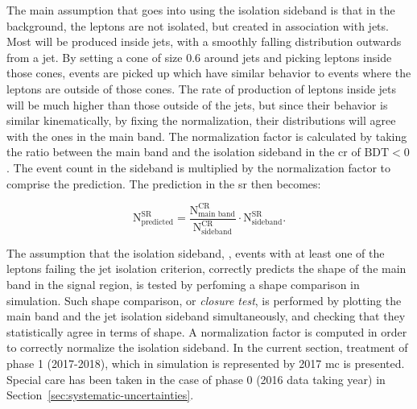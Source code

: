 The main assumption that goes into using the isolation sideband is that in the background, the leptons are not isolated, but created in association with jets. Most will be produced inside jets, with a smoothly falling distribution outwards from a jet. By setting a cone of size 0.6 around jets and picking leptons inside those cones, events are picked up which have similar behavior to events where the leptons are outside of those cones. The rate of production of leptons inside jets will be much higher than those outside of the jets, but since their behavior is similar kinematically, by fixing the normalization, their distributions will agree with the ones in the main band. The normalization factor is calculated by taking the ratio between the main band and the isolation sideband in the \gls{cr} of $\mathrm{BDT}<0$. The event count in the sideband is multiplied by the normalization factor to comprise the prediction. The prediction in the \gls{sr} then becomes:

\begin{equation}
\mathrm{N}^{\mathrm{SR}}_{\text{predicted}} = \frac{\mathrm{N}^{\mathrm{CR}}_{\text{main band}}}{\mathrm{N}^{\mathrm{CR}}_{\text{sideband}}} \cdot\mathrm{N}^{\mathrm{SR}}_{\text{sideband}}.
\end{equation}

The assumption that the isolation sideband, \ie, events with at least one of the leptons failing the jet isolation criterion, correctly predicts the shape of the main band in the signal region, is tested by perfoming a shape comparison in simulation. Such shape comparison, or \emph{closure test}, is performed by plotting the main band and the jet isolation sideband simultaneously, and checking that they statistically agree in terms of shape. A normalization factor is computed in order to correctly normalize the isolation sideband. In the current section, treatment of phase 1 (2017-2018), which in simulation is represented by 2017 \gls{mc} is presented. Special care has been taken in the case of phase 0 (2016 data taking year) in Section~\ref{sec:systematic-uncertainties}.

